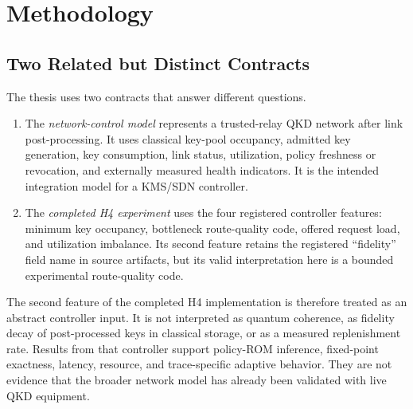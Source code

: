 \chapter{Methodology}
\label{chap:methodology}


\section{Two Related but Distinct Contracts}

The thesis uses two contracts that answer different questions.

\begin{enumerate}
  \item The \emph{network-control model} represents a trusted-relay QKD network
  after link post-processing. It uses classical key-pool occupancy, admitted key
  generation, key consumption, link status, utilization, policy freshness or
  revocation, and externally measured health indicators. It is the intended
  integration model for a KMS/SDN controller.
  \item The \emph{completed H4 experiment} uses the four registered controller
  features: minimum key occupancy, bottleneck route-quality code, offered request
  load, and utilization imbalance. Its second feature retains the registered
  ``fidelity'' field name in source artifacts, but its valid interpretation here is
  a bounded experimental route-quality code.
\end{enumerate}

The second feature of the completed H4 implementation is therefore treated as an
abstract controller input. It is not interpreted as quantum coherence, as fidelity
decay of post-processed keys in classical storage, or as a measured replenishment
rate. Results from that controller support policy-ROM inference, fixed-point
exactness, latency, resource, and trace-specific adaptive behavior. They are not
evidence that the broader network model has already been validated with live QKD
equipment.


